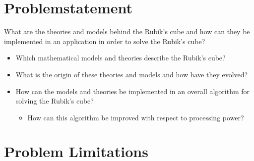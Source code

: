 \section{Problemstatement}
What are the theories and models behind the Rubik's cube and how can they be implemented in an application in order to solve the Rubik's cube?
\begin{itemize}
	\item Which mathematical models and theories describe the Rubik's cube?
	\item What is the origin of these theories and models and how have they evolved?
	\item How can the models and theories be implemented in an overall algorithm for solving the Rubik's cube?
	\begin{itemize}
		\item How can this algorithm be improved with respect to processing power?
	\end{itemize}
\end{itemize}
\section{Problem Limitations}
